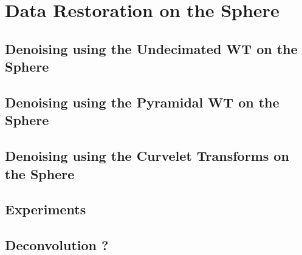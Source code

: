 
\chapter{Data Restoration on the Sphere}
\label{ch_mms}

\section{Denoising using the Undecimated WT on the Sphere}
\section{Denoising using the Pyramidal WT on the Sphere}
\section{Denoising using the Curvelet Transforms on the Sphere}

\section{Experiments}
 

\section{Deconvolution ?}
